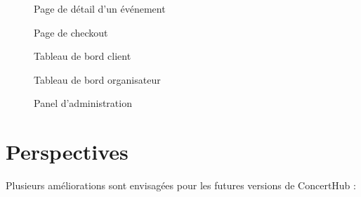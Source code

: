 \documentclass[a4paper,12pt,twoside]{report}
\begin{document}
\begin{figure}[!h]
    \centering
    \caption{Page de détail d'un événement}
    \label{fig:event-detail}
\end{figure}

\begin{figure}[!h]
    \centering
    \caption{Page de checkout}
    \label{fig:checkout}
\end{figure}

\begin{figure}[!h]
    \centering
    \caption{Tableau de bord client}
    \label{fig:client-dashboard}
\end{figure}

\begin{figure}[!h]
    \centering
    \caption{Tableau de bord organisateur}
    \label{fig:organizer-dashboard}
\end{figure}

\begin{figure}[!h]
    \centering
    \caption{Panel d'administration}
    \label{fig:admin-panel}
\end{figure}

\section{Perspectives}

Plusieurs améliorations sont envisagées pour les futures versions de ConcertHub :
\end{document}
